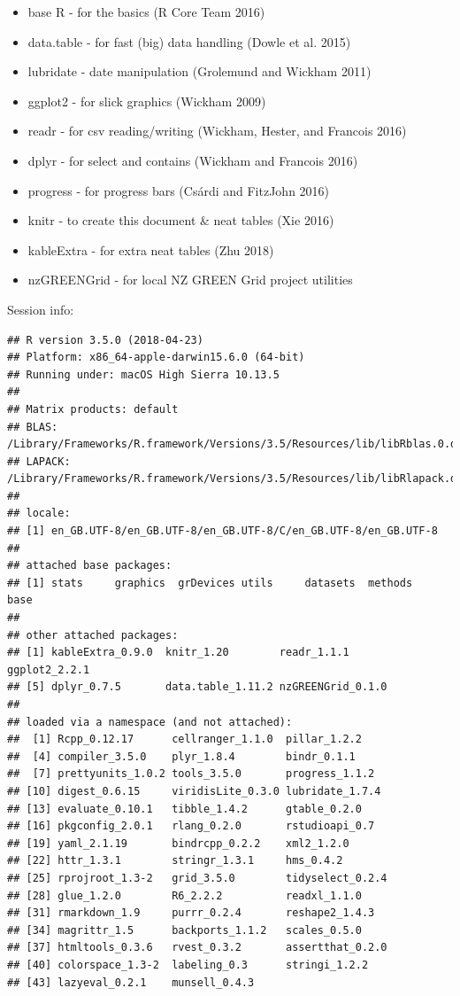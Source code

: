 \documentclass[]{article}
\providecommand{\tightlist}{%
  \setlength{\itemsep}{0pt}\setlength{\parskip}{0pt}}
\begin{document}
\begin{itemize}
\tightlist
\item
  base R - for the basics (R Core Team 2016)
\item
  data.table - for fast (big) data handling (Dowle et al. 2015)
\item
  lubridate - date manipulation (Grolemund and Wickham 2011)
\item
  ggplot2 - for slick graphics (Wickham 2009)
\item
  readr - for csv reading/writing (Wickham, Hester, and Francois 2016)
\item
  dplyr - for select and contains (Wickham and Francois 2016)
\item
  progress - for progress bars (Csárdi and FitzJohn 2016)
\item
  knitr - to create this document \& neat tables (Xie 2016)
\item
  kableExtra - for extra neat tables (Zhu 2018)
\item
  nzGREENGrid - for local NZ GREEN Grid project utilities
\end{itemize}

Session info:

\begin{verbatim}
## R version 3.5.0 (2018-04-23)
## Platform: x86_64-apple-darwin15.6.0 (64-bit)
## Running under: macOS High Sierra 10.13.5
## 
## Matrix products: default
## BLAS: /Library/Frameworks/R.framework/Versions/3.5/Resources/lib/libRblas.0.dylib
## LAPACK: /Library/Frameworks/R.framework/Versions/3.5/Resources/lib/libRlapack.dylib
## 
## locale:
## [1] en_GB.UTF-8/en_GB.UTF-8/en_GB.UTF-8/C/en_GB.UTF-8/en_GB.UTF-8
## 
## attached base packages:
## [1] stats     graphics  grDevices utils     datasets  methods   base     
## 
## other attached packages:
## [1] kableExtra_0.9.0  knitr_1.20        readr_1.1.1       ggplot2_2.2.1    
## [5] dplyr_0.7.5       data.table_1.11.2 nzGREENGrid_0.1.0
## 
## loaded via a namespace (and not attached):
##  [1] Rcpp_0.12.17      cellranger_1.1.0  pillar_1.2.2     
##  [4] compiler_3.5.0    plyr_1.8.4        bindr_0.1.1      
##  [7] prettyunits_1.0.2 tools_3.5.0       progress_1.1.2   
## [10] digest_0.6.15     viridisLite_0.3.0 lubridate_1.7.4  
## [13] evaluate_0.10.1   tibble_1.4.2      gtable_0.2.0     
## [16] pkgconfig_2.0.1   rlang_0.2.0       rstudioapi_0.7   
## [19] yaml_2.1.19       bindrcpp_0.2.2    xml2_1.2.0       
## [22] httr_1.3.1        stringr_1.3.1     hms_0.4.2        
## [25] rprojroot_1.3-2   grid_3.5.0        tidyselect_0.2.4 
## [28] glue_1.2.0        R6_2.2.2          readxl_1.1.0     
## [31] rmarkdown_1.9     purrr_0.2.4       reshape2_1.4.3   
## [34] magrittr_1.5      backports_1.1.2   scales_0.5.0     
## [37] htmltools_0.3.6   rvest_0.3.2       assertthat_0.2.0 
## [40] colorspace_1.3-2  labeling_0.3      stringi_1.2.2    
## [43] lazyeval_0.2.1    munsell_0.4.3
\end{verbatim}
\end{document}
